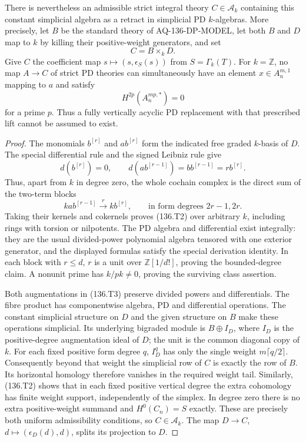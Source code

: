 There is nevertheless an admissible strict integral theory
$C\in\mathcal A_k$ containing this constant simplicial algebra as a retract
in simplicial PD $k$-algebras. More precisely, let $B$ be
the standard theory of AQ-136-DP-MODEL, let both $B$ and $D$
map to $k$ by killing their positive-weight generators, and set
\[
                             C=B\times_k D.               \tag{136.T3}
\]
Give $C$ the coefficient map
$s\mapsto(s,\epsilon_S(s))$ from $S=\Gamma_k(T)$.
For $k=\mathbb Z$, no map $A\to C$ of strict PD theories
can simultaneously have an element $x\in A_n^{m,1}$ mapping
to $a$ and satisfy
\[
                     H^{2p}(A_n^{mp,*})=0                 \tag{136.T4}
\]
for a prime $p$. Thus a fully vertically acyclic PD replacement
with that prescribed lift cannot be assumed to exist.

\begin{proof}
The monomials $b^{[r]}$ and $ab^{[r]}$ form the indicated
free graded $k$-basis of $D$. The special differential rule
and the signed Leibniz rule give
\[
 d(b^{[r]})=0,\qquad
 d(ab^{[r-1]})=b b^{[r-1]}=r b^{[r]}.
\]
Thus, apart from $k$ in degree zero, the whole cochain complex
is the direct sum of the two-term blocks
\[
 k ab^{[r-1]}\xrightarrow{\ r\ }k b^{[r]},
       \qquad\text{in form degrees }2r-1,2r.
\]
Taking their kernels and cokernels proves (136.T2) over
arbitrary $k$, including rings with torsion or nilpotents.
The PD algebra and differential exist integrally: they are
the usual divided-power polynomial algebra tensored with
one exterior generator, and the displayed formulas satisfy
the special derivation identity. In each block with $r\le d$,
$r$ is a unit over $\mathbb Z[1/d!]$, proving the bounded-degree
claim. A nonunit prime has $k/pk\ne0$, proving the surviving
class assertion.

Both augmentations in (136.T3) preserve divided powers and
differentials. The fibre product has componentwise algebra,
PD and differential operations. The constant simplicial
structure on $D$ and the given structure on $B$ make these
operations simplicial. Its underlying bigraded module is
$B\oplus I_D$, where $I_D$ is the positive-degree augmentation
ideal of $D$; the unit is the common diagonal copy of $k$.
For each fixed positive form degree $q$, $I_D^q$ has only the
single weight $m\lceil q/2\rceil$.
Consequently beyond that weight the simplicial row of $C$
is exactly the row of $B$. Its horizontal homology therefore
vanishes in the required weight tail. Similarly, (136.T2)
shows that in each fixed positive vertical degree the extra
cohomology has finite weight support, independently of the
simplex. In degree zero there is no extra positive-weight
summand and $H^0(C_n)=S$ exactly. These are precisely both
uniform admissibility conditions, so $C\in\mathcal A_k$.
The map $D\to C$, $d\mapsto(\epsilon_D(d),d)$, splits its
projection to $D$.


\end{proof}
